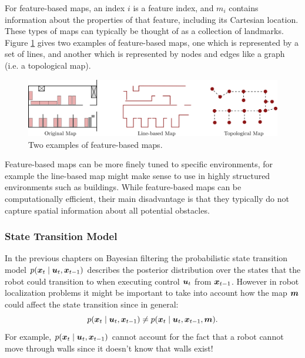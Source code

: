 For feature-based maps, an index $i$ is a feature index, and $m_i$ contains information about the properties of that feature, including its Cartesian location. These types of maps can typically be thought of as a collection of landmarks. Figure \ref{fig:FeatureBasedMaps} gives two examples of feature-based maps, one which is represented by a set of lines, and another which is represented by nodes and edges like a graph (i.e. a topological map).
\begin{figure}[ht]
\centering
\includegraphics[width=0.8\linewidth]{tex/figs/ch16_figs/feature_based_maps.png}
\caption{Two examples of feature-based maps.}
\label{fig:FeatureBasedMaps}
\end{figure}
Feature-based maps can be more finely tuned to specific environments, for example the line-based map might make sense to use in highly structured environments such as buildings. While feature-based maps can be computationally efficient, their main disadvantage is that they typically do not capture spatial information about all potential obstacles.

\subsubsection{State Transition Model}
In the previous chapters on Bayesian filtering the probabilistic state transition model $p(\bm{x}_t \mid \bm{u}_t, \bm{x}_{t-1})$ describes the posterior distribution over the states that the robot could transition to when executing control $\bm{u}_t$ from $\bm{x}_{t-1}$. However in robot localization problems it might be important to take into account how the map $\bm{m}$ could affect the state transition since in general:
\begin{equation*}
p(\bm{x}_t \mid \bm{u}_t, \bm{x}_{t-1}) \neq p(\bm{x}_t \mid \bm{u}_t, \bm{x}_{t-1}, \bm{m}).
\end{equation*}
For example, $p(\bm{x}_t \mid \bm{u}_t, \bm{x}_{t-1})$ cannot account for the fact that a robot cannot move through walls since it doesn't know that walls exist!

